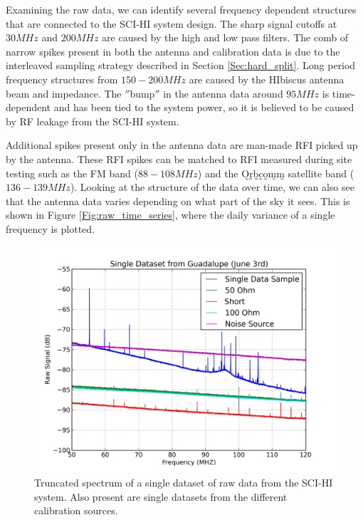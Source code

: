 Examining the raw data, we can identify several frequency dependent structures that are connected to the SCI-HI system design. The sharp signal cutoffs at $30 MHz$ and $200 MHz$ are caused by the high and low pass filters. The comb of narrow spikes present in both the antenna and calibration data is due to the interleaved sampling strategy described in Section \ref{Sec:hard_split}. Long period frequency structures from $150-200 MHz$ are caused by the HIbiscus antenna beam and impedance. The $''$bump$''$ in the antenna data around $95 MHz$ is time-dependent and has been tied to the system power, so it is believed to be caused by RF leakage from the SCI-HI system. 

Additional spikes present only in the antenna data are man-made RFI picked up by the antenna. These RFI spikes can be matched to RFI measured during site testing such as the FM band ($88-108 MHz$) and the O̰r̰b̰c̰o̰m̰m̰ satellite band ($136-139 MHz$). Looking at the structure of the data over time, we can also see that the antenna data varies depending on what part of the sky it sees. This is shown in Figure \ref{Fig:raw_time_series}, where the daily variance of a single frequency is plotted.  


\begin{figure}[htb]
\begin{center}
\includegraphics[width=0.9\linewidth]{Data_analysis/figures/single_raw_trunc_guad_june03.png}
\caption{Truncated spectrum of a single dataset of raw data from the SCI-HI system. Also present are single datasets from the different calibration sources.}
\label{Fig:raw_data_trunc}
\end{center}
\end{figure}


